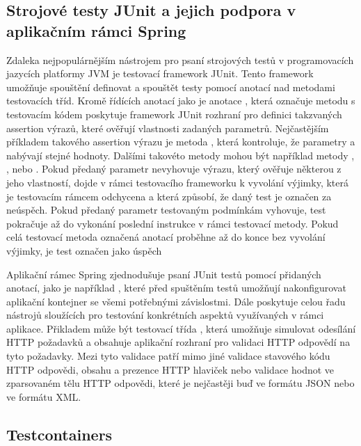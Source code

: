 
\subsection{Strojové testy JUnit a jejich podpora v aplikačním rámci Spring}

Zdaleka nejpopulárnějším nástrojem pro psaní strojových testů v programovacích jazycích platformy JVM je testovací framework JUnit. Tento framework umožňuje spouštění definovat a spouštět testy pomocí anotací nad metodami testovacích tříd. Kromě řídících anotací jako je anotace , která označuje metodu s testovacím kódem poskytuje framework JUnit rozhraní pro definici takzvaných assertion výrazů, které ověřují vlastnosti zadaných parametrů. Nejčastějším příkladem takového assertion výrazu je metoda  , která kontroluje, že parametry  a  nabývají stejné hodnoty. Dalšími takovéto metody mohou být například metody , ,  nebo . Pokud předaný parametr nevyhovuje výrazu, který ověřuje některou z jeho vlastností, dojde v rámci testovacího frameworku k vyvolání výjimky, která je testovacím rámcem odchycena a která způsobí, že daný test je označen za neúspěch. Pokud předaný parametr testovaným podmínkám vyhovuje, test pokračuje až do vykonání poslední instrukce v rámci testovací metody. Pokud celá testovací metoda označená anotací  proběhne až do konce bez vyvolání výjimky, je test označen jako úspěch \cite{gulati_junit_2017}

Aplikační rámec Spring zjednodušuje psaní JUnit testů pomocí přidaných anotací, jako je například , které před spuštěním testů umožňují nakonfigurovat aplikační kontejner se všemi potřebnými závislostmi. Dále poskytuje celou řadu nástrojů sloužících pro testování konkrétních aspektů využívaných v rámci aplikace. Přikladem může být testovací třída , která umožňuje simulovat odesílání HTTP požadavků a obsahuje aplikační rozhraní pro validaci HTTP odpovědí na tyto požadavky. Mezi tyto validace patří mimo jiné validace stavového kódu HTTP odpovědi, obsahu a prezence HTTP hlaviček nebo validace hodnot ve zparsovaném tělu HTTP odpovědi, které je nejčastěji buď ve formátu JSON nebo ve formátu XML.

\subsection{Testcontainers}

